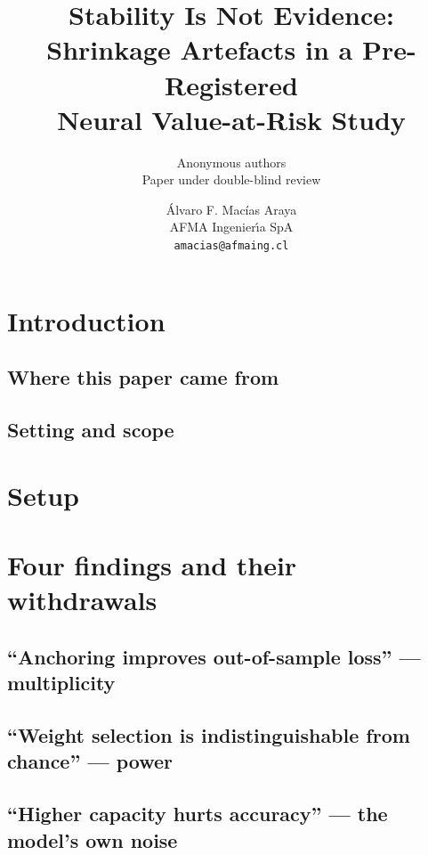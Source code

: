 \documentclass[11pt]{article}
\title{Stability Is Not Evidence:\\Shrinkage Artefacts in a Pre-Registered\\Neural Value-at-Risk Study}
\author{Anonymous authors\\Paper under double-blind review}
\author{%
    Álvaro F. Macías Araya\\
    AFMA Ingenier{\'\i}a SpA\\
    \texttt{amacias@afmaing.cl}
  }
\date{}
\begin{document}
\maketitle

\begin{abstract}

\end{abstract}

\section{Introduction}\label{sec:intro}


\subsection{Where this paper came from}\label{sec:provenance}


\subsection{Setting and scope}\label{sec:scope}


\section{Setup}\label{sec:setup}


\section{Four findings and their withdrawals}\label{sec:findings}


\subsection{``Anchoring improves out-of-sample loss'' --- multiplicity}\label{sec:multiplicity}


\subsection{``Weight selection is indistinguishable from chance'' --- power}\label{sec:power}


\subsection{``Higher capacity hurts accuracy'' --- the model's own noise}\label{sec:capacity}

\end{document}
